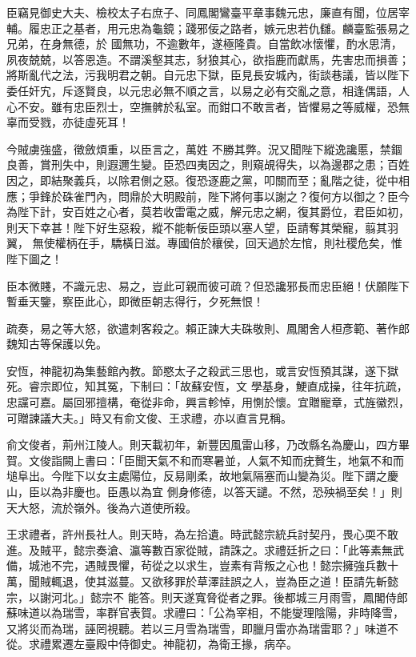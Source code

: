 \begin{pinyinscope}
 臣竊見御史大夫、檢校太子右庶子、同鳳閣鸞臺平章事魏元忠，廉直有聞，位居宰輔。履忠正之基者，用元忠為龜鏡；踐邪佞之路者，嫉元忠若仇讎。麟臺監張易之兄弟，在身無德，於
 國無功，不逾數年，遂極隆貴。自當飲冰懷懼，酌水思清，夙夜兢兢，以答恩造。不謂溪壑其志，豺狼其心，欲指鹿而獻馬，先害忠而損善；將斯亂代之法，污我明君之朝。自元忠下獄，臣見長安城內，街談巷議，皆以陛下委任奸宄，斥逐賢良，以元忠必無不順之言，以易之必有交亂之意，相逢偶語，人心不安。雖有忠臣烈士，空撫髀於私室。而鉗口不敢言者，皆懼易之等威權，恐無辜而受戮，亦徒虛死耳！



 今賊虜強盛，徵斂煩重，以臣言之，萬姓
 不勝其弊。況又聞陛下縱逸讒慝，禁錮良善，賞刑失中，則遐邇生變。臣恐四夷因之，則窺覘得失，以為邊郡之患；百姓因之，即結聚義兵，以除君側之惡。復恐逐鹿之黨，叩關而至；亂階之徒，從中相應；爭鋒於硃雀門內，問鼎於大明殿前，陛下將何事以謝之？復何方以御之？臣今為陛下計，安百姓之心者，莫若收雷電之威，解元忠之網，復其爵位，君臣如初，則天下幸甚！陛下好生惡殺，縱不能斬佞臣頭以塞人望，臣請奪其榮寵，翦其羽翼，
 無使權柄在手，驕橫日滋。專國倍於穰侯，回天過於左悺，則社稷危矣，惟陛下圖之！



 臣本微賤，不識元忠、易之，豈此可親而彼可疏？但恐讒邪長而忠臣絕！伏願陛下暫垂天鑒，察臣此心，即微臣朝志得行，夕死無恨！



 疏奏，易之等大怒，欲遣刺客殺之。賴正諫大夫硃敬則、鳳閣舍人桓彥範、著作郎魏知古等保護以免。



 安恆，神龍初為集藝館內教。節愍太子之殺武三思也，或言安恆預其謀，遂下獄死。睿宗即位，知其冤，下制曰：「故蘇安恆，文
 學基身，鯁直成操，往年抗疏，忠讜可嘉。屬回邪擅構，奄從非命，興言軫悼，用惻於懷。宜贈寵章，式旌徽烈，可贈諫議大夫。」時又有俞文俊、王求禮，亦以直言見稱。



 俞文俊者，荊州江陵人。則天載初年，新豐因風雷山移，乃改縣名為慶山，四方畢賀。文俊詣闕上書曰：「臣聞天氣不和而寒暑並，人氣不知而疣贅生，地氣不和而塠阜出。今陛下以女主處陽位，反易剛柔，故地氣隔塞而山變為災。陛下謂之慶山，臣以為非慶也。臣愚以為宜
 側身修德，以答天譴。不然，恐殃禍至矣！」則天大怒，流於嶺外。後為六道使所殺。



 王求禮者，許州長社人。則天時，為左拾遺。時武懿宗統兵討契丹，畏心耎不敢進。及賊平，懿宗奏滄、瀛等數百家從賊，請誅之。求禮廷折之曰：「此等素無武備，城池不完，遇賊畏懼，茍從之以求生，豈素有背叛之心也！懿宗擁強兵數十萬，聞賊輒退，使其滋蔓。又欲移罪於草澤詿誤之人，豈為臣之道！臣請先斬懿宗，以謝河北。」懿宗不
 能答。則天遂寬脅從者之罪。後都城三月雨雪，鳳閣侍郎蘇味道以為瑞雪，率群官表賀。求禮曰：「公為宰相，不能燮理陰陽，非時降雪，又將災而為瑞，誣罔視聽。若以三月雪為瑞雪，即臘月雷亦為瑞雷耶？」味道不從。求禮累遷左臺殿中侍御史。神龍初，為衛王掾，病卒。




\end{pinyinscope}
